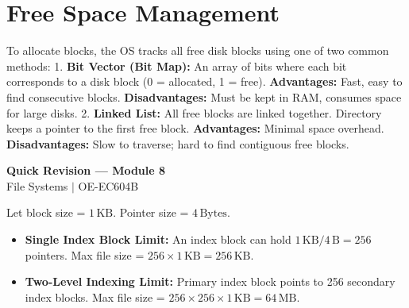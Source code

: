 \documentclass[12pt,a4paper]{article}
\begin{document}
\section{Free Space Management}

To allocate blocks, the OS tracks all free disk blocks using one of two common methods:
1. \textbf{Bit Vector (Bit Map):} An array of bits where each bit corresponds to a disk block (0 = allocated, 1 = free). \textbf{Advantages:} Fast, easy to find consecutive blocks. \textbf{Disadvantages:} Must be kept in RAM, consumes space for large disks.
2. \textbf{Linked List:} All free blocks are linked together. Directory keeps a pointer to the first free block. \textbf{Advantages:} Minimal space overhead. \textbf{Disadvantages:} Slow to traverse; hard to find contiguous free blocks.

\newpage
\begin{center}
  {\large\bfseries\color{myred} Quick Revision --- Module 8}\\[3pt]
  {\small\color{mydark} File Systems $|$ OE-EC604B}
\end{center}
\noindent{\color{myred}\rule{\linewidth}{1.2pt}}
\vspace{4pt}

\begin{tcolorbox}[formulabox, title={\textbf{File Allocation Calculations}}]
Let block size = $1\,\text{KB}$. Pointer size = $4\,\text{Bytes}$.
\begin{itemize}[leftmargin=*, itemsep=3pt]
  \item \textbf{Single Index Block Limit:} An index block can hold $1\,\text{KB} / 4\,\text{B} = 256$ pointers. Max file size = $256 \times 1\,\text{KB} = 256\,\text{KB}$.
  \item \textbf{Two-Level Indexing Limit:} Primary index block points to 256 secondary index blocks. Max file size = $256 \times 256 \times 1\,\text{KB} = 64\,\text{MB}$.
\end{itemize}
\end{tcolorbox}
\end{document}
